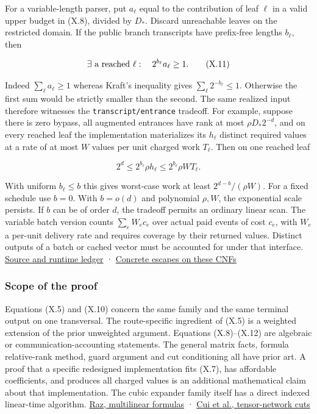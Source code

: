 \documentclass[
  11pt,
]{article}
\begin{document}
For a variable-length parser, put \(a_\ell\) equal to the contribution
of leaf \(\ell\) in a valid upper budget in (X.8), divided by \(D_*\).
Discard unreachable leaves on the restricted domain. If the public
branch transcripts have prefix-free lengths \(b_\ell\), then

\[
     \exists\hbox{ a reached }\ell:\quad 2^{b_\ell}a_\ell\ge1. \tag{X.11}
\]

Indeed \(\sum_\ell a_\ell\ge1\) whereas Kraft's inequality gives
\(\sum_\ell2^{-b_\ell}\le1\). Otherwise the first sum would be strictly
smaller than the second. The same realized input therefore witnesses the
\nolinkurl{transcript/entrance} tradeoff. For example, suppose there is
zero bypass, all augmented entrances have rank at most
\(\rho D_*2^{-d}\), and on every reached leaf the implementation
materializes its \(h_\ell\) distinct required values at a rate of at
most \(W\) values per unit charged work \(T_\ell\). Then on one reached
leaf

\[
       2^d\le 2^{b_\ell}\rho h_\ell
                          \le 2^{b_\ell}\rho W T_\ell .       \tag{X.12}
\]

With uniform \(b_\ell\le b\) this gives worst-case work at least
\(2^{d-b}/(\rho W)\). For a fixed schedule use \(b=0\). With \(b=o(d)\)
and polynomial \(\rho,W\), the exponential scale persists. If \(b\) can
be of order \(d\), the tradeoff permits an ordinary linear scan. The
variable batch version counts \(\sum_e W_ec_e\) over actual paid events
of cost \(c_e\), with \(W_e\) a per-unit delivery rate and requires
coverage by their returned values. Distinct outputs of a batch or cached
vector must be accounted for under that interface.
\href{https://github.com/dch-and-Elara/some-research-inspired-by-openais-eth-preprint/tree/main/rank-budget-barriers}{Source and runtime ledger} ·
\href{https://github.com/dch-and-Elara/some-research-inspired-by-openais-eth-preprint/tree/main/rank-budget-barriers}{Concrete escapes on these
CNFs}

\subsubsection{Scope of the proof}\label{scope-of-the-proof}

Equations (X.5) and (X.10) concern the same family and the same terminal
output on one transversal. The route-specific ingredient of (X.5) is a
weighted extension of the prior unweighted argument. Equations
(X.8)--(X.12) are algebraic or communication-accounting statements. The
general matrix facts, formula relative-rank method, guard argument and
cut conditioning all have prior art. A proof that a specific redesigned
implementation fits (X.7), has affordable coefficients, and produces all
charged values is an additional mathematical claim about that
implementation. The cubic expander family itself has a direct indexed
linear-time algorithm.
\href{https://eccc.weizmann.ac.il/report/2003/067/}{Raz, multilinear
formulas} · \href{https://arxiv.org/abs/1508.04644}{Cui et al.,
tensor-network cuts}
\end{document}
